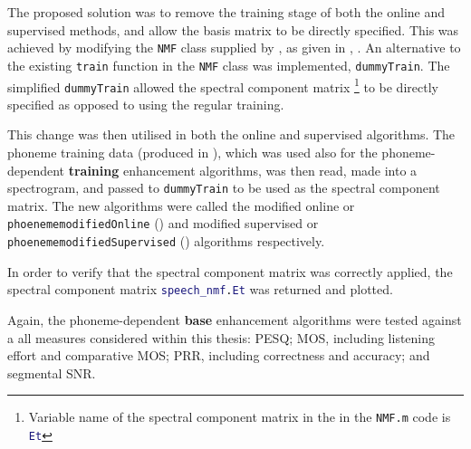 The proposed solution was to remove the training stage of both the
online and supervised methods, and allow the basis matrix to be directly
specified. This was achieved by modifying the \lstinline[language=bash]!NMF!
class supplied by \citet{mohammadiha2013supervised}, as given in
, \textit{}. An alternative
to the existing \lstinline[language=bash]!train! function in the
\lstinline[language=bash]!NMF! class was implemented, \lstinline[language=bash]!dummyTrain!.
The simplified \lstinline[language=bash]!dummyTrain! allowed the
spectral component matrix%
\footnote{Variable name of the spectral component matrix in the in the \lstinline[language=bash]!NMF.m!
code is \lstinline[language=Matlab]!Et!%
} to be directly specified as opposed to using the regular training.

This change was then utilised in both the online and supervised algorithms.
The phoneme training data (produced in ),
which was used also for the phoneme-dependent\textbf{ training} enhancement
algorithms, was then read, made into a spectrogram, and passed to
\lstinline[language=bash]!dummyTrain! to be used as the spectral
component matrix. The new algorithms were called the modified online
or \lstinline[language=bash]!phoenememodifiedOnline! ()
and modified supervised or \lstinline[language=bash]!phoenememodifiedSupervised!
() algorithms respectively.

In order to verify that the spectral component matrix was correctly
applied, the spectral component matrix \lstinline[language=Matlab]!speech_nmf.Et!
was returned and plotted.

Again, the phoneme-dependent\textbf{ base} enhancement algorithms
were tested against a all measures considered within this thesis:
\ac{PESQ}; \ac{MOS}, including listening effort and comparative
\ac{MOS}; \ac{PRR}, including correctness and accuracy; and segmental
\ac{SNR}.
